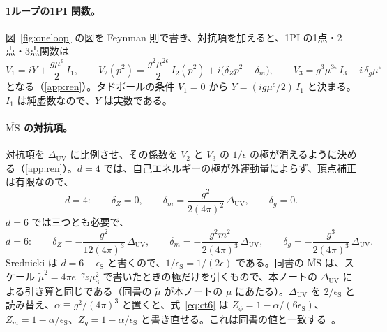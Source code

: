 \documentclass[a4paper,10pt]{ltjsarticle}
\begin{document}
\paragraph{1ループの1PI 関数。}図~\ref{fig:oneloop} の図を Feynman 則で書き、対抗項を加えると、1PI の1点・2点・3点関数は
\begin{equation}
V_1=iY+\frac{g\mu^\epsilon}{2}\,I_1,\qquad
V_2(p^2)=\frac{g^2\mu^{2\epsilon}}{2}\,I_2(p^2)+i\bigl(\delta_Zp^2-\delta_m\bigr),\qquad
V_3=g^3\mu^{3\epsilon}\,I_3-i\,\delta_g\mu^{\epsilon}
\label{eq:V}
\end{equation}
となる（\ref{app:ren}）。タドポールの条件 $V_1=0$ から $Y=(ig\mu^\epsilon/2)\,I_1$ と決まる。$I_1$ は純虚数なので、$Y$ は実数である。

\paragraph{$\overline{\mathrm{MS}}$ の対抗項。}対抗項を $\Delta_{\mathrm{UV}}$ に比例させ、その係数を $V_2$ と $V_3$ の $1/\epsilon$ の極が消えるように決める（\ref{app:ren}）。$d=4$ では、自己エネルギーの極が外運動量によらず、頂点補正は有限なので、
\begin{equation}
d=4:\qquad \delta_Z=0,\qquad \delta_m=\frac{g^2}{2(4\pi)^2}\,\Delta_{\mathrm{UV}},\qquad \delta_g=0 .
\label{eq:ct4}
\end{equation}
$d=6$ では三つとも必要で、
\begin{equation}
d=6:\qquad \delta_Z=-\frac{g^2}{12(4\pi)^3}\,\Delta_{\mathrm{UV}},\qquad \delta_m=-\frac{g^2m^2}{2(4\pi)^3}\,\Delta_{\mathrm{UV}},\qquad \delta_g=-\frac{g^3}{2(4\pi)^3}\,\Delta_{\mathrm{UV}}.
\label{eq:ct6}
\end{equation}
Srednicki は $d=6-\epsilon_{\mathrm S}$ と書くので、$1/\epsilon_{\mathrm S}=1/(2\epsilon)$ である。同書の $\overline{\mathrm{MS}}$ は、スケール $\tilde\mu^2=4\pi e^{-\gamma_E}\mu_{\mathrm{S}}^2$ で書いたときの極だけを引くもので、本ノートの $\Delta_{\mathrm{UV}}$ による引き算と同じである（同書の $\tilde\mu$ が本ノートの $\mu$ にあたる）。$\Delta_{\mathrm{UV}}$ を $2/\epsilon_{\mathrm S}$ と読み替え、$\alpha\equiv g^2/(4\pi)^3$ と置くと、式~\eqref{eq:ct6} は $Z_\phi=1-\alpha/(6\epsilon_{\mathrm S})$、$Z_m=1-\alpha/\epsilon_{\mathrm S}$、$Z_g=1-\alpha/\epsilon_{\mathrm S}$ と書き直せる。これは同書の値と一致する~\cite{srednicki}。
\end{document}
